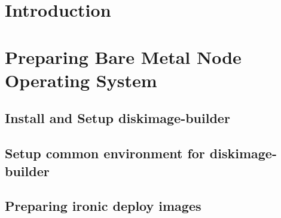 \documentclass[letterpaper]{article}
\begin{document}
\graphicspath{{common/figures/}}
\thispagestyle{empty}


 

\newpage
\tableofcontents
\newpage


\section{Introduction} \label{sec:introduction}

 








\clearpage
\section{Preparing Bare Metal Node Operating System}\label{sec:baremetalprep}


\subsection{Install and Setup diskimage-builder}\label{sec:dib_install}


\subsection{Setup common environment for diskimage-builder}\label{sec:dib_environment}


\subsection{Preparing ironic deploy images}\label{sec:ironic_deploy_images}

\end{document}
